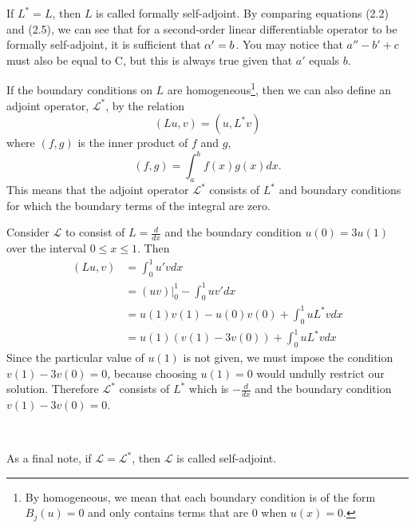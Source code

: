 If \(L^* = L\), then \(L\) is called formally self-adjoint. By comparing equations (2.2) and (2.5), we can see that for a second-order linear differentiable operator to be formally self-adjoint, it is sufficient that \(\alpha'=b\). You may notice that \(a''-b'+c\) must also be equal to C, but this is always true given that \(a'\) equals \(b\).

\begin{definition}
	If the boundary conditions on \(L\) are homogeneous\footnote{By homogeneous, we mean that each boundary condition is of the form \(B_j(u)=0\) and only contains terms that are 0 when \(u(x)=0\).}, then we can also define an adjoint operator, \(\mathcal{L}^*\), by the relation
	\begin{equation}
		(Lu,v) = (u,L^*v)
	\end{equation}
	where \((f,g)\) is the inner product of \(f\) and \(g\),
	\begin{equation}
		(f,g) = \int_a^bf(x)g(x)dx.
	\end{equation}
	This means that the adjoint operator \(\mathcal{L}^*\) consists of \(L^*\) and boundary conditions for which the boundary terms of the integral are zero. 
\end{definition}

\begin{example}
	Consider \(\mathcal{L}\) to consist of \(L=\frac{d}{dx}\) and the boundary condition \(u(0)=3u(1)\) over the interval \(0\leq x \leq 1\). Then
	\begin{equation}
		\begin{split}
			(Lu,v) &= \int_0^1u'vdx\\
			       &= (uv)\biggr\rvert_0^1 - \int_0^1 uv'dx\\
			       &= u(1)v(1)-u(0)v(0)+\int_0^1uL^*vdx\\
			       &= u(1)(v(1)-3v(0)) + \int_0^1uL^*vdx
		\end{split}
	\end{equation}
	Since the particular value of \(u(1)\) is not given, we must impose the condition \(v(1)-3v(0)=0\), because choosing \(u(1)=0\) would undully restrict our solution. Therefore \(\mathcal{L^*}\) consists of \(L^*\) which is \(-\frac{d}{dx}\) and the boundary condition \(v(1) - 3v(0)=0\). 
\end{example}

\

As a final note, if \(\mathcal{L}=\mathcal{L}^*\), then \(\mathcal{L}\) is called self-adjoint.

